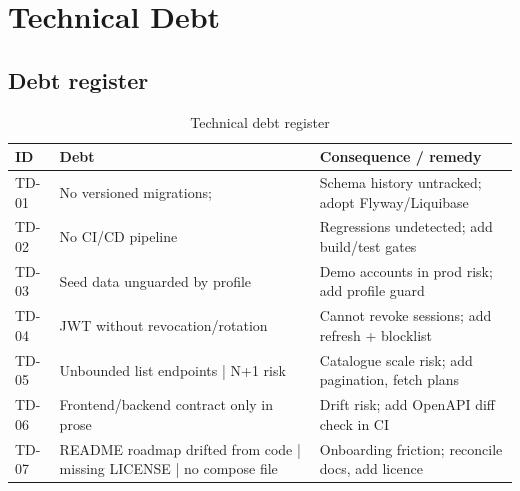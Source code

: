 \section{Technical Debt}
\label{sec:technical-debt}

\subsection{Debt register}

\begin{table}[H]
\centering
\caption{Technical debt register}
\label{tab:tech-debt}
\begin{tabular}{@{}L{2.2cm}L{5.6cm}L{6.4cm}@{}}
\toprule
\textbf{ID} & \textbf{Debt} & \textbf{Consequence / remedy} \\
\midrule
TD-01 & No versioned migrations;  & Schema history untracked; adopt Flyway/Liquibase \\
TD-02 & No CI/CD pipeline & Regressions undetected; add build/test gates \\
TD-03 & Seed data unguarded by profile & Demo accounts in prod risk; add profile guard \\
TD-04 & JWT without revocation/rotation & Cannot revoke sessions; add refresh + blocklist \\
TD-05 & Unbounded list endpoints | N+1 risk & Catalogue scale risk; add pagination, fetch plans \\
TD-06 & Frontend/backend contract only in prose & Drift risk; add OpenAPI diff check in CI \\
TD-07 & README roadmap drifted from code | missing LICENSE | no compose file & Onboarding friction; reconcile docs, add licence \\
\bottomrule
\end{tabular}
\end{table}
